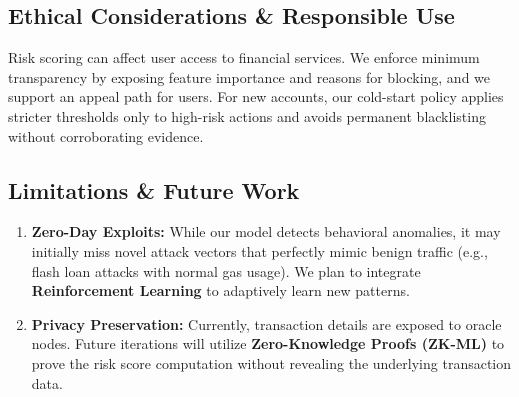\subsection{Ethical Considerations \& Responsible Use}
Risk scoring can affect user access to financial services. We enforce minimum transparency by exposing feature importance and reasons for blocking, and we support an appeal path for users. For new accounts, our cold-start policy applies stricter thresholds only to high-risk actions and avoids permanent blacklisting without corroborating evidence.

\subsection{Limitations & Future Work}
\begin{enumerate}
    \item \textbf{Zero-Day Exploits:} While our model detects behavioral anomalies, it may initially miss novel attack vectors that perfectly mimic benign traffic (e.g., flash loan attacks with normal gas usage). We plan to integrate \textbf{Reinforcement Learning} to adaptively learn new patterns.
    \item \textbf{Privacy Preservation:} Currently, transaction details are exposed to oracle nodes. Future iterations will utilize \textbf{Zero-Knowledge Proofs (ZK-ML)} to prove the risk score computation without revealing the underlying transaction data.
\end{enumerate}
